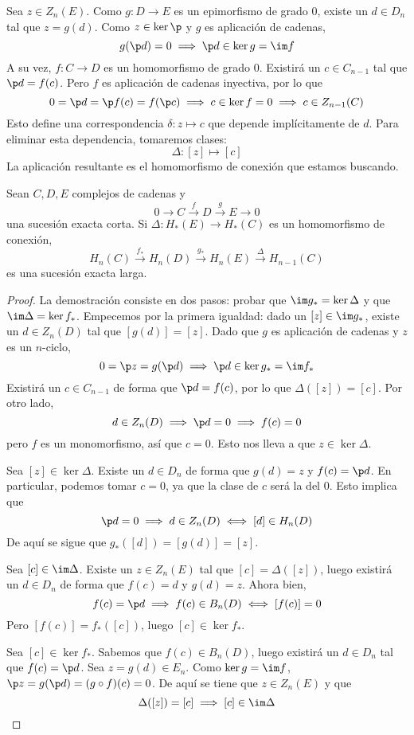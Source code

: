 Sea $z \in Z_n(E)$. Como $g\colon D \to E$ es un epimorfismo de grado 0, existe
un $d \in D_n$ tal que $z=g(d)$. Como $z\in \ker \p$ y $g$ es aplicación de
cadenas,
\[g(\p d)=0 \implies \p d \in \ker g=\im f\]
A su vez, $f\colon C \to D$ es un homomorfismo de grado 0. Existirá un $c \in
C_{n-1}$ tal que $\p d=f(c)$. Pero $f$ es aplicación de cadenas inyectiva, por
lo que
\[0=\p d=\p f(c)=f(\p c) \implies c \in \ker f=0 \implies c \in Z_{n-1}(C)\]
Esto define una correspondencia $\delta\colon z \mapsto c$ que depende
implícitamente de $d$. Para eliminar esta dependencia, tomaremos clases:
\[\Delta\colon [z] \mapsto [c]\]
La aplicación resultante es el homomorfismo de conexión que estamos buscando.

\begin{theorem}
Sean $C, D, E$ complejos de cadenas y
\[0 \to C \xrightarrow{ f } D \xrightarrow{ g } E \to 0\]
una sucesión exacta corta. Si $\Delta\colon H_*(E) \to H_*(C)$ es un homomorfismo
de conexión,
\[H_n(C) \xrightarrow{ f_* } H_n(D) \xrightarrow{ g_* } H_n(E)
\xrightarrow{ \Delta } H_{n-1}(C)\] es una sucesión exacta larga.
\end{theorem}

\begin{proof}
La demostración consiste en dos pasos: probar que $\im g_*=\ker \Delta$ y que
$\im \Delta = \ker f_*$. Empecemos por la primera igualdad: dado un $[z] \in \im
g_*$, existe un $d \in Z_n(D)$ tal que $[g(d)]=[z]$. Dado que $g$ es aplicación
de cadenas y $z$ es un $n$-ciclo,
\[0=\p z=g(\p d) \implies \p d \in \ker g_*=\im f_*\]
Existirá un $c \in C_{n-1}$ de forma que $\p d=f(c)$, por lo que $\Delta([z])=
[c]$. Por otro lado,
\[d \in Z_n(D) \implies \p d=0 \implies f(c)=0\]
pero $f$ es un monomorfismo, así que $c=0$. Esto nos lleva a que $z \in
\ker \Delta$.

Sea $[z] \in \ker \Delta$. Existe un $d \in D_n$ de forma que $g(d)=z$ y $f(c)=
\p d$. En particular, podemos tomar $c=0$, ya que la clase de $c$ será la del 0.
Esto implica que
\[\p d=0 \implies d \in Z_n(D) \iff [d] \in H_n(D)\]
De aquí se sigue que $g_*([d])=[g(d)]=[z]$.

Sea $[c] \in \im \Delta$. Existe un $z \in Z_n(E)$ tal que $[c]=\Delta([z])$, luego
existirá un $d \in D_n$ de forma que $f(c)=d$ y $g(d)=z$. Ahora bien,
\[f(c)= \p d \implies f(c) \in B_n(D) \iff [f(c)]=0\]
Pero $[f(c)]=f_*([c])$, luego $[c] \in \ker f_*$.

Sea $[c] \in \ker f_*$. Sabemos que $f(c) \in B_n(D)$, luego existirá un
$d \in D_n$ tal que $f(c)=\p d$. Sea $z=g(d) \in E_n$. Como $\ker g=\im f$,
$\p z=g(\p d)=(g\circ f)(c)=0$. De aquí se tiene que $z \in Z_n(E)$ y que
\[\Delta([z])=[c] \implies [c] \in \im \Delta\]
\end{proof}
